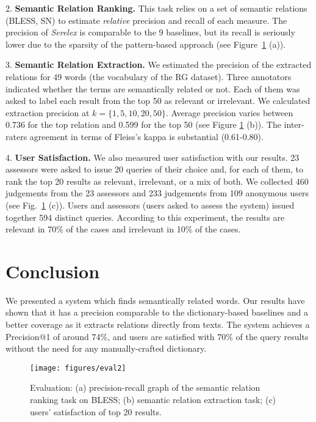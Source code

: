 \documentclass[runningheads,a4paper]{llncs}
\begin{document}
2. \textbf{Semantic Relation Ranking.} This task relies on a set of semantic relations (BLESS,  SN) to estimate \textit{relative} precision and recall of each measure. The precision of \textit{Serelex}  is comparable to the 9 baselines, but its recall is seriously lower due to the sparsity of the pattern-based approach (see Figure~\ref{fig:eval} (a)). 

3. \textbf{Semantic Relation Extraction.} We estimated the precision of the extracted relations for 49 words (the vocabulary of the RG dataset). Three annotators indicated whether the terms are semantically related or not. Each of them was asked to label each result from the top 50 as relevant or irrelevant. We calculated extraction precision at $k = \{1, 5, 10, 20, 50\}$. Average precision varies between 0.736 for the top relation and 0.599 for the top 50 (see Figure \ref{fig:eval} (b)). The inter-raters agreement in terms of Fleiss's kappa is substantial (0.61-0.80).

4. \textbf{User Satisfaction.} We also measured user satisfaction with our results. 23 assessors were asked to issue 20 queries of their choice and, for each of them, to rank the top 20 results as relevant, irrelevant, or a mix of both. We collected 460 judgements from the 23 assessors and 233 judgements from 109 anonymous users (see Fig.~\ref{fig:eval} (c)). Users and assessors (users asked to assess the system) issued together 594 distinct queries. According to this experiment, the results are relevant in 70\% of the cases and irrelevant in 10\% of the cases. %

\section{Conclusion}

We presented a system which finds semantically related words. Our results have shown that it has a precision comparable to the dictionary-based baselines and a better coverage as it extracts relations directly from texts. The system achieves a Precision@1 of around 74\%, and users are satisfied with 70\% of the query results without the need for any manually-crafted dictionary.

\begin{figure}
	\centering
		\texttt{[image: figures/eval2]}		
		\caption{ Evaluation: (a) precision-recall graph of the semantic relation ranking task on BLESS; (b) semantic relation extraction task; (c) users' satisfaction of top 20 results. }
	\label{fig:eval}
\end{figure}



\end{document}
